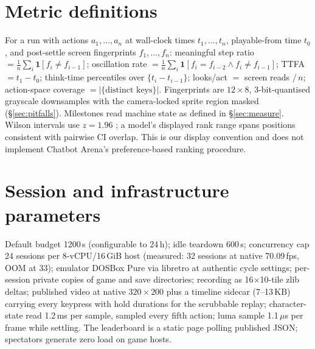 \documentclass{article} %
\begin{document}
\section{Metric definitions}
\label{app:metrics}
For a run with actions $a_1,\dots,a_n$ at wall-clock times
$t_1,\dots,t_n$, playable-from time $t_0$, and post-settle screen
fingerprints $f_1,\dots,f_n$:
meaningful step ratio $=\frac{1}{n}\sum_i \mathbf{1}[f_i \neq f_{i-1}]$;
oscillation rate $=\frac{1}{n}\sum_i \mathbf{1}[f_i = f_{i-2} \wedge f_i
\neq f_{i-1}]$; TTFA $=t_1 - t_0$; think-time percentiles over
$\{t_i - t_{i-1}\}$; looks/act $=$ screen reads $/\,n$; action-space
coverage $=|\{\text{distinct keys}\}|$. Fingerprints are $12\times8$,
3-bit-quantised grayscale downsamples with the camera-locked sprite region
masked (\S\ref{sec:pitfalls}). Milestones read machine state as defined in
\S\ref{sec:measure}. Wilson intervals use $z=1.96$
\citep{wilson1927probable}; a model's displayed rank range spans positions
consistent with pairwise CI overlap. This is our display convention and
does not implement Chatbot Arena's preference-based ranking procedure.

\section{Session and infrastructure parameters}
\label{app:infra}
Default budget 1200\,s (configurable to 24\,h); idle teardown 600\,s;
concurrency cap 24 sessions per 8-vCPU/16\,GiB host (measured: 32 sessions
at native 70.09\,fps, OOM at 33); emulator DOSBox Pure via libretro at
authentic cycle settings; per-session private copies of game and save
directories; recording as 16$\times$10-tile zlib deltas; published video at
native $320\times200$ plus a timeline sidecar (7--13\,KB) carrying every
keypress with hold durations for the scrubbable replay; character-state
read 1.2\,ms per sample, sampled every fifth action; luma sample
1.1\,$\mu$s per frame while settling. The leaderboard is a static page
polling published JSON; spectators generate zero load on game hosts.
\end{document}
